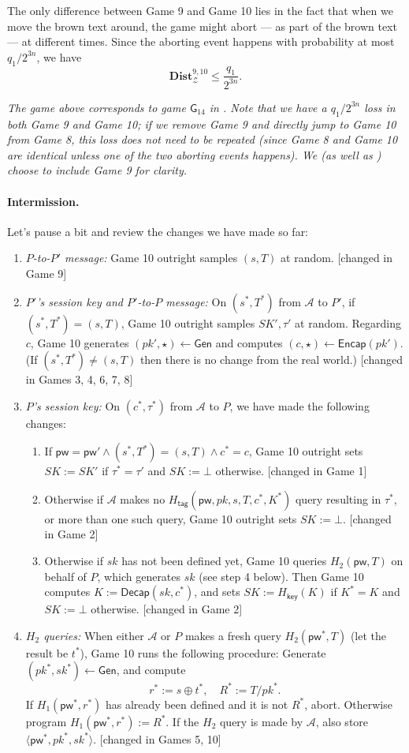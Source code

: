 \documentclass{article}
\theoremstyle{plain}
\theoremstyle{definition}
\theoremstyle{remark}
\newcommand{\adv}{\mathcal{A}}
\newcommand{\env}{\mathcal{Z}}
\newcommand{\Dist}{\mathbf{Dist}}
\newcommand{\Gen}{\mathsf{Gen}}
\newcommand{\Encap}{\mathsf{Encap}}
\newcommand{\Decap}{\mathsf{Decap}}
\newcommand{\Hkey}{H_\mathsf{key}}
\newcommand{\Htag}{H_\mathsf{tag}}
\newcommand{\pw}{\mathsf{pw}}
\begin{document}
The only difference between Game 9 and Game 10 lies in the fact that when we move the {\color{brown} brown} text around, the game might abort --- as part of the {\color{brown} brown} text --- at different times. Since the aborting event happens with probability at most $q_1/2^{3n}$, we have
\[
\Dist_\env^{9,10} \leq \frac{q_1}{2^{3n}}.
\]

\emph{{\color{red}The game above corresponds to game $\mathsf{G}_{14}$ in \cite{EPRINT:ArrBarJar25}. Note that we have a $q_1/2^{3n}$ loss in both Game 9 and Game 10; if we remove Game 9 and directly jump to Game 10 from Game 8, this loss does not need to be repeated (since Game 8 and Game 10 are identical unless one of the two aborting events happens). We (as well as \cite{EPRINT:ArrBarJar25}) choose to include Game 9 for clarity.}}

\paragraph{Intermission.}
Let's pause a bit and review the changes we have made so far:
\begin{enumerate}
  \item \emph{$P$-to-$P'$ message:} Game 10 outright samples $(s,T)$ at random. [changed in Game 9]
  \item \emph{$P'$'s session key and $P'$-to-$P$ message:} On $(s^*,T^*)$ from $\adv$ to $P'$, if $(s^*,T^*) = (s,T)$, Game 10 outright samples $SK',\tau'$ at random. Regarding $c$, Game 10 generates $(pk',\star) \gets \Gen$ and computes $(c,\star) \gets \Encap(pk')$. (If $(s^*,T^*) \neq (s,T)$ then there is no change from the real world.) [changed in Games 3, 4, 6, 7, 8]
  \item \emph{$P$'s session key:} On $(c^*,\tau^*)$ from $\adv$ to $P$, we have made the following changes:
      \begin{enumerate}
        \item If $\pw = \pw' \land (s^*,T^*) = (s,T) \land c^* = c$, Game 10 outright sets $SK := SK'$ if $\tau^* = \tau'$ and $SK := \bot$ otherwise. [changed in Game 1]
        \item Otherwise if $\adv$ makes no $\Htag(\pw,pk,s,T,c^*,K^*)$ query resulting in $\tau^*$, or more than one such query, Game 10 outright sets $SK := \bot$. [changed in Game 2]
        \item Otherwise if $sk$ has not been defined yet, Game 10 queries $H_2(\pw,T)$ on behalf of $P$, which generates $sk$ (see step 4 below). Then Game 10 computes $K := \Decap(sk,c^*)$, and sets $SK := \Hkey(K)$ if $K^* = K$ and $SK := \bot$ otherwise. [changed in Game 2]
      \end{enumerate}
  \item \emph{$H_2$ queries:} When either $\adv$ or $P$ makes a fresh query $H_2(\pw^*,T)$ (let the result be $t^*$), Game 10 runs the following procedure: Generate $(pk^*,sk^*) \gets \Gen$, and compute
      \[
      r^* := s \oplus t^*, \quad R^* := T/pk^*.
      \]
      If $H_1(\pw^*,r^*)$ has already been defined and it is not $R^*$, abort. Otherwise program $H_1(\pw^*,r^*) := R^*$. If the $H_2$ query is made by $\adv$, also store $\langle\pw^*,pk^*,sk^*\rangle$. [changed in Games 5, 10]
\end{enumerate}
\end{document}
